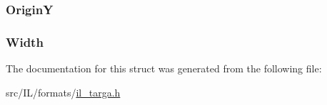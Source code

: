 \hypertarget{struct_t_a_r_g_a_h_e_a_d_a35ff566adf72cc2055bcb03190e2b190}{
\subsubsection[{Origin\-Y}]{ Origin\-Y}}\label{struct_t_a_r_g_a_h_e_a_d_a35ff566adf72cc2055bcb03190e2b190}
\hypertarget{struct_t_a_r_g_a_h_e_a_d_aed0f0a923b8346ba51a4de45fff77ee7}{
\subsubsection[{Width}]{ Width}}\label{struct_t_a_r_g_a_h_e_a_d_aed0f0a923b8346ba51a4de45fff77ee7}


The documentation for this struct was generated from the following file\-:\begin{DoxyCompactItemize}
\item 
src/\-I\-L/formats/\hyperlink{il__targa_8h}{il\-\_\-targa.\-h}\end{DoxyCompactItemize}
